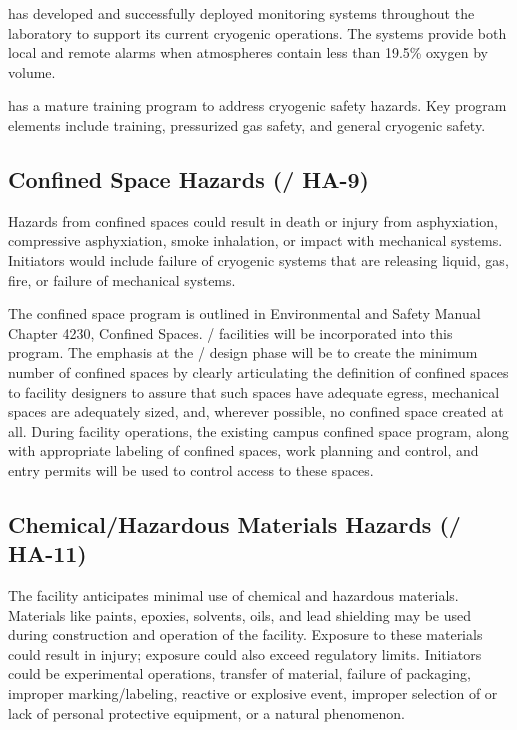\fnal has developed and successfully deployed  monitoring
systems throughout the laboratory to support its current cryogenic
operations. The systems provide both local and remote alarms when
atmospheres contain less than 19.5\% oxygen by volume.

\fnal has a mature training program to address cryogenic safety
hazards. Key program elements include  training,
pressurized gas safety, and general cryogenic safety.


\subsection{Confined Space Hazards (/ HA-9)}

Hazards from confined spaces could result in death or injury from
asphyxiation, compressive asphyxiation, smoke inhalation, or impact
with mechanical systems. Initiators would include failure of cryogenic
systems that are releasing liquid, gas, fire, or failure of mechanical
systems.

The \fnal confined space program is outlined in \fnal Environmental
and Safety Manual Chapter 4230, Confined
Spaces. / facilities will be incorporated into
this program. The emphasis at the / design
phase will be to create the minimum number of confined spaces by
clearly articulating the definition of confined spaces to facility
designers to assure that such spaces have adequate egress, mechanical
spaces are adequately sized, and, wherever possible, no confined space
created at all. During facility operations, the existing campus
confined space program, along with appropriate labeling of confined
spaces, work planning and control, and entry permits will be used to
control access to these spaces.


\subsection{Chemical/Hazardous Materials Hazards (/ HA-11)}

The  facility anticipates minimal use of chemical and hazardous
materials. Materials like paints, epoxies, solvents, oils, and lead
shielding may be used during construction and operation of the
facility. Exposure to these materials could result in injury; 
exposure could also exceed regulatory limits. Initiators could be
experimental operations, transfer of material, failure of packaging,
improper marking/labeling, reactive or explosive event, improper
selection of or lack of personal protective equipment, or a
natural phenomenon.

